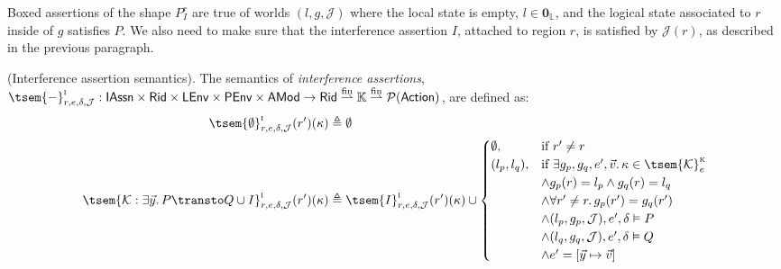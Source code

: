 Boxed assertions of the shape $\boxed{P}^r_I$ are true of worlds $(l, g, \mathcal{J})$ where the local state is empty, $l \in \mathbf{0}_\mathbb{L}$, and the logical state associated to $r$ inside of $g$ satisfies $P$. We also need to make sure that the interference assertion $I$, attached to region $r$, is satisfied by $\mathcal{J}(r)$, as described in the previous paragraph.

\begin{defn}
	\label{defn:interferenceSem}
	(Interference assertion semantics).
	The semantics of \emph{interference assertions}, $\tsem{-}^\textsc{i}_{r, e, \delta, \mathcal{J}} : \mathsf{IAssn} \times \mathsf{Rid} \times \mathsf{LEnv} \times \mathsf{PEnv} \times \mathsf{AMod} \rightarrow \mathsf{Rid} \overset{\text{fin}}{\rightharpoonup} \mathbb{K} \overset{\text{fin}}{\rightharpoonup} \mathcal{P}(\mathsf{Action})$, are defined as:
	\begin{align*}
		\tsem{\emptyset}^\textsc{i}_{r, e, \delta, \mathcal{J}}(r')(\kappa) &\triangleq \emptyset
		\\
		\tsem{\mathcal{K}: \exists \vec{y} \ldotp P \transto Q \cup I}^\textsc{i}_{r, e, \delta, \mathcal{J}}(r')(\kappa) &\triangleq
			\tsem{I}^\textsc{i}_{r, e, \delta, \mathcal{J}}(r')(\kappa)
			\cup 
			\begin{cases}
				\emptyset, & \text{if } r' \neq r
				\\
				(l_p, l_q), & \text{if } \exists g_p, g_q, e', \vec{v} \ldotp
				\kappa \in \tsem{\mathcal{K}}^\textsc{k}_e
				\\
				& \land g_p(r) = l_p \land g_q(r) = l_q
				\\
				& \land \forall r' \neq r \ldotp g_p(r') = g_q(r')
				\\
				& \land (l_p, g_p, \mathcal{J}), e', \delta \vDash P
				\\
				& \land (l_q, g_q, \mathcal{J}), e', \delta \vDash Q
				\\
				& \land e' = [\vec{y} \mapsto \vec{v}] 
			\end{cases}
	\end{align*}
\end{defn}

